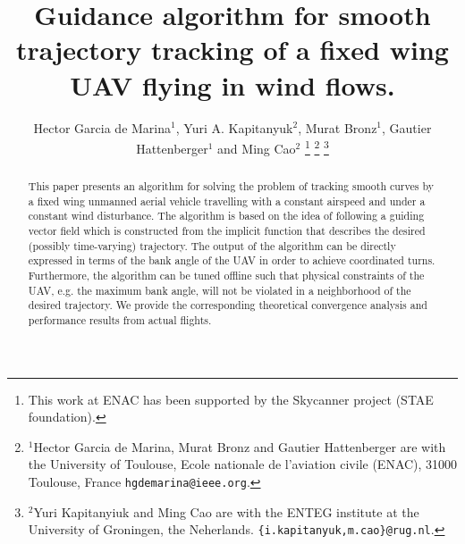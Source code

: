\documentclass[letterpaper, 10 pt, conference]{ieeeconf}  %
\title{\LARGE \bf
Guidance algorithm for smooth trajectory tracking of a fixed wing UAV flying in wind flows.
}
\author{Hector Garcia de Marina$^{1}$, Yuri A. Kapitanyuk$^{2}$, Murat Bronz$^{1}$, Gautier Hattenberger$^{1}$ and Ming Cao$^{2}$%
\thanks{This work at ENAC has been supported by the Skycanner project (STAE foundation).}%
\thanks{$^{1}$Hector Garcia de Marina, Murat Bronz and Gautier Hattenberger are with the University of Toulouse, Ecole nationale de l'aviation civile (ENAC), 31000 Toulouse, France {\tt\small hgdemarina@ieee.org}.}%
\thanks{$^{2}$Yuri Kapitanyiuk and Ming Cao are with the ENTEG institute at the University of Groningen, the Neherlands.
		{\tt\small \{i.kapitanyuk,m.cao\}@rug.nl}.}%
}
\begin{document}
\maketitle
\thispagestyle{empty}
\pagestyle{empty}


\begin{abstract}
	This paper presents an algorithm for solving the problem of tracking smooth curves by a fixed wing unmanned aerial vehicle travelling with a constant airspeed and under a constant wind disturbance. The algorithm is based on the idea of following a guiding vector field which is constructed from the implicit function that describes the desired (possibly time-varying) trajectory. The output of the algorithm can be directly expressed in terms of the bank angle of the UAV in order to achieve coordinated turns. Furthermore, the algorithm can be tuned offline such that physical constraints of the UAV, e.g. the maximum bank angle, will not be violated in a neighborhood of the desired trajectory. We provide the corresponding theoretical convergence analysis and performance results from actual flights.
\end{abstract}


\end{document}
